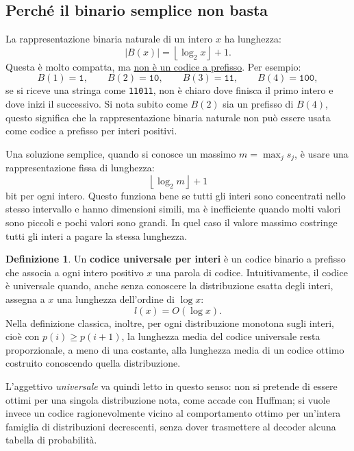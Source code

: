 \documentclass{article}
\theoremstyle{definition}
\newtheorem{definizione}{Definizione}[section]
\numberwithin{equation}{section}
\begin{document}
\subsection{Perché il binario semplice non basta}
La rappresentazione binaria naturale di un intero $x$ ha lunghezza:
\[
    |B(x)|=\left\lfloor\log_2 x\right\rfloor+1.
\]
Questa è molto compatta, ma \uline{non è un codice a prefisso}. Per esempio:
\[
    B(1)=\texttt{1},
    \qquad
    B(2)=\texttt{10},
    \qquad
    B(3)=\texttt{11},
    \qquad
    B(4)=\texttt{100},
\]
se si riceve una stringa come \texttt{11011}, non è chiaro dove finisca il primo intero e dove inizi il successivo. Si nota subito come $B(2)$ sia un prefisso di $B(4)$, questo significa che la rappresentazione binaria naturale non può essere usata come codice a prefisso per interi positivi.

Una soluzione semplice, quando si conosce un massimo $m=\max_j s_j$, è usare una rappresentazione fissa di lunghezza:
\begin{equation}\label{eq:fixed_length_integer_code}
    \left\lfloor\log_2 m\right\rfloor+1
\end{equation}
bit per ogni intero. Questo funziona bene se tutti gli interi sono concentrati nello stesso intervallo e hanno dimensioni simili, ma è inefficiente quando molti valori sono piccoli e pochi valori sono grandi. In quel caso il valore massimo costringe tutti gli interi a pagare la stessa lunghezza.

\begin{definizione}
    Un \textbf{codice universale per interi} è un codice binario a prefisso che associa a ogni intero positivo $x$ una parola di codice. Intuitivamente, il codice è universale quando, anche senza conoscere la distribuzione esatta degli interi, assegna a $x$ una lunghezza dell'ordine di $\log x$:
    \[
        l(x)=O(\log x).
    \]
    Nella definizione classica, inoltre, per ogni distribuzione monotona sugli interi, cioè con $p(i)\geq p(i+1)$, la lunghezza media del codice universale resta proporzionale, a meno di una costante, alla lunghezza media di un codice ottimo costruito conoscendo quella distribuzione.
\end{definizione}

L'aggettivo \emph{universale} va quindi letto in questo senso: non si pretende di essere ottimi per una singola distribuzione nota, come accade con Huffman; si vuole invece un codice ragionevolmente vicino al comportamento ottimo per un'intera famiglia di distribuzioni decrescenti, senza dover trasmettere al decoder alcuna tabella di probabilità.
\end{document}
